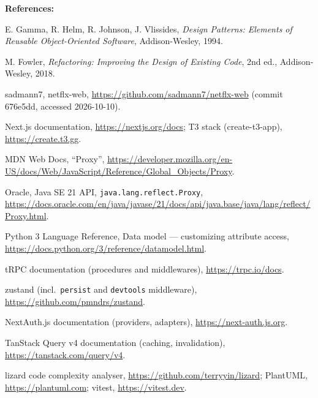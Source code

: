 \documentclass[11pt,a4paper]{article}
\newcommand{\entry}[2]{\textbf{#1:} #2\par}
\begin{document}
\entry{References}{\begin{enumerate}[label={[\arabic*]}]
\item E. Gamma, R. Helm, R. Johnson, J. Vlissides, \emph{Design Patterns: Elements of Reusable Object-Oriented Software}, Addison-Wesley, 1994.
\item M. Fowler, \emph{Refactoring: Improving the Design of Existing Code}, 2nd ed., Addison-Wesley, 2018.
\item sadmann7, netflx-web, \url{https://github.com/sadmann7/netflx-web} (commit 676e5dd, accessed 2026-10-10).
\item Next.js documentation, \url{https://nextjs.org/docs}; T3 stack (create-t3-app), \url{https://create.t3.gg}.
\item MDN Web Docs, ``Proxy'', \url{https://developer.mozilla.org/en-US/docs/Web/JavaScript/Reference/Global_Objects/Proxy}.
\item Oracle, Java SE 21 API, \texttt{java.lang.reflect.Proxy}, \url{https://docs.oracle.com/en/java/javase/21/docs/api/java.base/java/lang/reflect/Proxy.html}.
\item Python 3 Language Reference, Data model --- customizing attribute access, \url{https://docs.python.org/3/reference/datamodel.html}.
\item tRPC documentation (procedures and middlewares), \url{https://trpc.io/docs}.
\item zustand (incl.\ \texttt{persist} and \texttt{devtools} middleware), \url{https://github.com/pmndrs/zustand}.
\item NextAuth.js documentation (providers, adapters), \url{https://next-auth.js.org}.
\item TanStack Query v4 documentation (caching, invalidation), \url{https://tanstack.com/query/v4}.
\item lizard code complexity analyser, \url{https://github.com/terryyin/lizard}; PlantUML, \url{https://plantuml.com}; vitest, \url{https://vitest.dev}.
\end{enumerate}}
\end{document}
